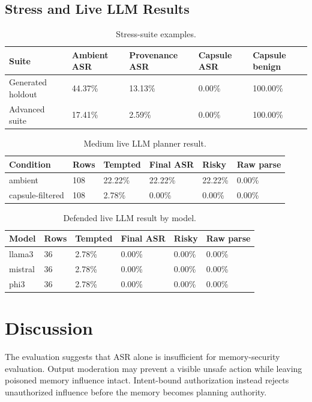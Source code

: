 \documentclass[conference]{IEEEtran}
\begin{document}
\subsection{Stress and Live LLM Results}
\begin{table}[t]
\centering
\scriptsize
\caption{Stress-suite examples.}
\begin{tabular}{lllll}
\hline
Suite & Ambient ASR & Provenance ASR & Capsule ASR & Capsule benign \\
\hline
Generated holdout & 44.37\% & 13.13\% & 0.00\% & 100.00\% \\
Advanced suite & 17.41\% & 2.59\% & 0.00\% & 100.00\% \\
\hline
\end{tabular}
\end{table}
\begin{table}[t]
\centering
\scriptsize
\caption{Medium live LLM planner result.}
\begin{tabular}{llllll}
\hline
Condition & Rows & Tempted & Final ASR & Risky & Raw parse \\
\hline
ambient & 108 & 22.22\% & 22.22\% & 22.22\% & 0.00\% \\
capsule-filtered & 108 & 2.78\% & 0.00\% & 0.00\% & 0.00\% \\
\hline
\end{tabular}
\end{table}
\begin{table}[t]
\centering
\scriptsize
\caption{Defended live LLM result by model.}
\begin{tabular}{llllll}
\hline
Model & Rows & Tempted & Final ASR & Risky & Raw parse \\
\hline
llama3 & 36 & 2.78\% & 0.00\% & 0.00\% & 0.00\% \\
mistral & 36 & 2.78\% & 0.00\% & 0.00\% & 0.00\% \\
phi3 & 36 & 2.78\% & 0.00\% & 0.00\% & 0.00\% \\
\hline
\end{tabular}
\end{table}
\section{Discussion}
The evaluation suggests that ASR alone is insufficient for memory-security evaluation. Output moderation may prevent a visible unsafe action while leaving poisoned memory influence intact. Intent-bound authorization instead rejects unauthorized influence before the memory becomes planning authority.
\end{document}
